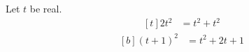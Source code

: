 \documentclass{article}
\begin{document}
Let $t$ be real.
\begin{equation}
\begin{aligned}[t]
2t^2 &= t^2 + t^2
\end{aligned}
\label{eq:al}
\end{equation}
\begin{equation}
\begin{aligned}[b]
(t+1)^2 &= t^2 + 2t + 1
\end{aligned}
\label{eq:al2}
\end{equation}
\end{document}
